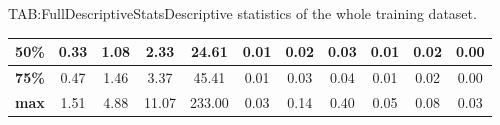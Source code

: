 \begin{landscape}
\begin{table}[Complete Descriptive Statistics]{TAB:FullDescriptiveStats}{Descriptive statistics of the whole training dataset.}
\begin{adjustbox}{width=1\linewidth}
\begin{tabular}{|c|*{10}{c|}}
                \hline
                \textbf{50\%}    & 0.33                            & 1.08                             & 2.33                               & 24.61                         & 0.01                                & 0.02                                 & 0.03                               & 0.01                                    & 0.02                              & 0.00                                       \\
                \hline
                \textbf{75\%}    & 0.47                            & 1.46                             & 3.37                               & 45.41                         & 0.01                                & 0.03                                 & 0.04                               & 0.01                                    & 0.02                              & 0.00                                       \\
                \hline
                \textbf{max}     & 1.51                            & 4.88                             & 11.07                              & 233.00                        & 0.03                                & 0.14                                 & 0.40                               & 0.05                                    & 0.08                              & 0.03                                       \\
                \hline
            \end{tabular}
        \end{adjustbox}

        \bigskip


\end{table}
\end{landscape}
